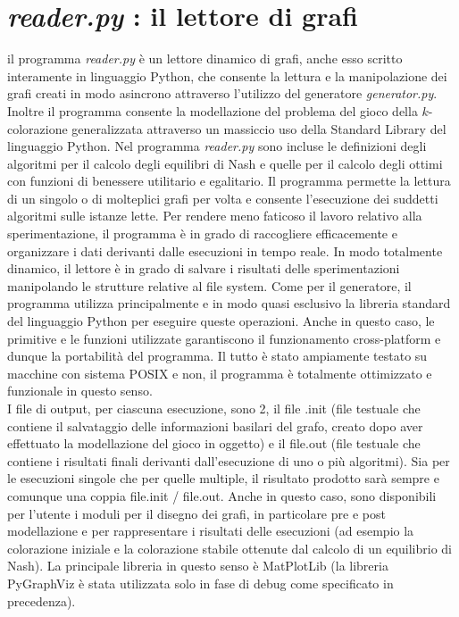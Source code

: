 \section{\textit{reader.py} : il lettore di grafi}
\justify
il programma \textit{reader.py} è un lettore dinamico di grafi, anche esso scritto interamente in linguaggio Python, che consente la lettura e la manipolazione dei grafi creati in modo asincrono attraverso l'utilizzo del generatore \textit{generator.py}. Inoltre il programma consente la modellazione del problema del gioco della \(k\)-colorazione generalizzata attraverso un massiccio uso della Standard Library del linguaggio Python. Nel programma \textit{reader.py} sono incluse le definizioni degli algoritmi per il calcolo degli equilibri di Nash e quelle per il calcolo degli ottimi con funzioni di benessere utilitario e egalitario. Il programma permette la lettura di un singolo o di molteplici grafi per volta e consente l'esecuzione dei suddetti algoritmi sulle istanze lette. Per rendere meno faticoso il lavoro relativo alla sperimentazione, il programma è in grado di raccogliere efficacemente e organizzare i dati derivanti dalle esecuzioni in tempo reale. In modo totalmente dinamico, il lettore è in grado di salvare i risultati delle sperimentazioni manipolando le strutture relative al file system. Come per il generatore, il programma utilizza principalmente e in modo quasi esclusivo la libreria standard del linguaggio Python per eseguire queste operazioni. Anche in questo caso, le primitive e le funzioni utilizzate garantiscono il funzionamento cross-platform e dunque la portabilità del programma. Il tutto è stato ampiamente testato su macchine con sistema POSIX e non, il programma è totalmente ottimizzato e funzionale in questo senso.\\
I file di output, per ciascuna esecuzione, sono 2, il file .init (file testuale che contiene il salvataggio delle informazioni basilari del grafo, creato dopo aver effettuato la modellazione del gioco in oggetto) e il file.out (file testuale che contiene i risultati finali derivanti dall'esecuzione di uno o più algoritmi). Sia per le esecuzioni singole che per quelle multiple, il risultato prodotto sarà sempre e comunque una coppia file.init / file.out. Anche in questo caso, sono disponibili per l'utente i moduli per il disegno dei grafi, in particolare pre e post modellazione e per rappresentare i risultati delle esecuzioni (ad esempio la colorazione iniziale e la colorazione stabile ottenute dal calcolo di un equilibrio di Nash). La principale libreria in questo senso è MatPlotLib (la libreria PyGraphViz è stata utilizzata solo in fase di debug come specificato in precedenza).\\
